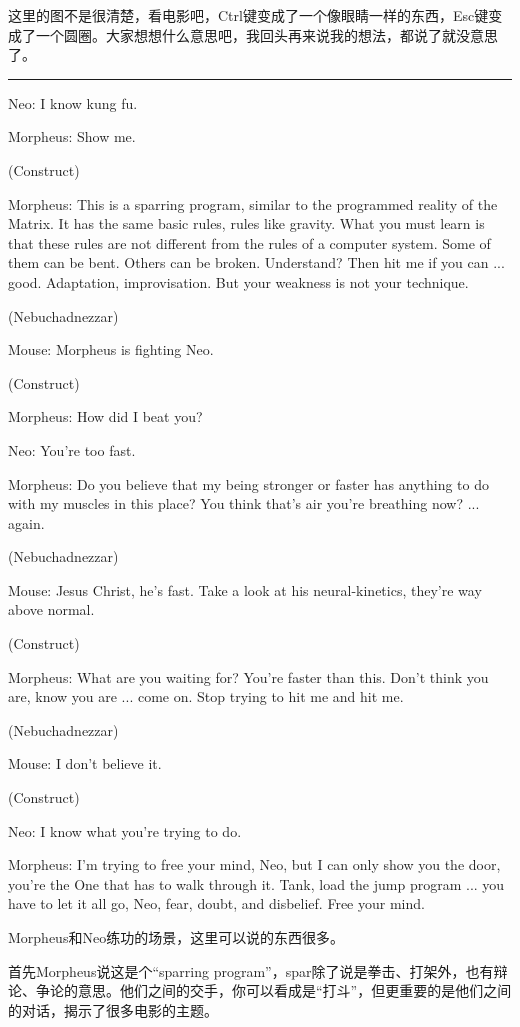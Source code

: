 \documentclass{ctexart}
\newcommand{\myparsep}{\noindent \rule[0.5ex]{\linewidth}{1pt}}
\newenvironment{myquote}{\color{green} \setlength{\leftskip}{6em} \setlength{\rightskip}{4em} \setlength{\parindent}{-2em}}{\par}
\begin{document}
这里的图不是很清楚，看电影吧，Ctrl键变成了一个像眼睛一样的东西，Esc键变成了一个圆圈。大家想想什么意思吧，我回头再来说我的想法，都说了就没意思了。

\myparsep

\begin{myquote}
Neo: I know kung fu.

Morpheus: Show me.

(Construct)

Morpheus: This is a sparring program, similar to the programmed reality of the Matrix. It has the same basic rules, rules like gravity. What you must learn is that these rules are not different from the rules of a computer system. Some of them can be bent. Others can be broken. Understand? Then hit me if you can ... good. Adaptation, improvisation. But your weakness is not your technique.

(Nebuchadnezzar)

Mouse: Morpheus is fighting Neo.

(Construct)

Morpheus: How did I beat you?

Neo: You're too fast.

Morpheus: Do you believe that my being stronger or faster has anything to do with my muscles in this place? You think that's air you're breathing now? ... again.

(Nebuchadnezzar)

Mouse: Jesus Christ, he's fast. Take a look at his neural-kinetics, they're way above normal.

(Construct)

Morpheus: What are you waiting for? You're faster than this. Don't think you are, know you are ... come on. Stop trying to hit me and hit me.

(Nebuchadnezzar)

Mouse: I don't believe it.

(Construct)

Neo: I know what you're trying to do.

Morpheus: I'm trying to free your mind, Neo, but I can only show you the door, you're the One that has to walk through it. Tank, load the jump program ... you have to let it all go, Neo, fear, doubt, and disbelief. Free your mind.
\end{myquote}

Morpheus和Neo练功的场景，这里可以说的东西很多。

首先Morpheus说这是个“sparring program”，spar除了说是拳击、打架外，也有辩论、争论的意思。他们之间的交手，你可以看成是“打斗”，但更重要的是他们之间的对话，揭示了很多电影的主题。
\end{document}

